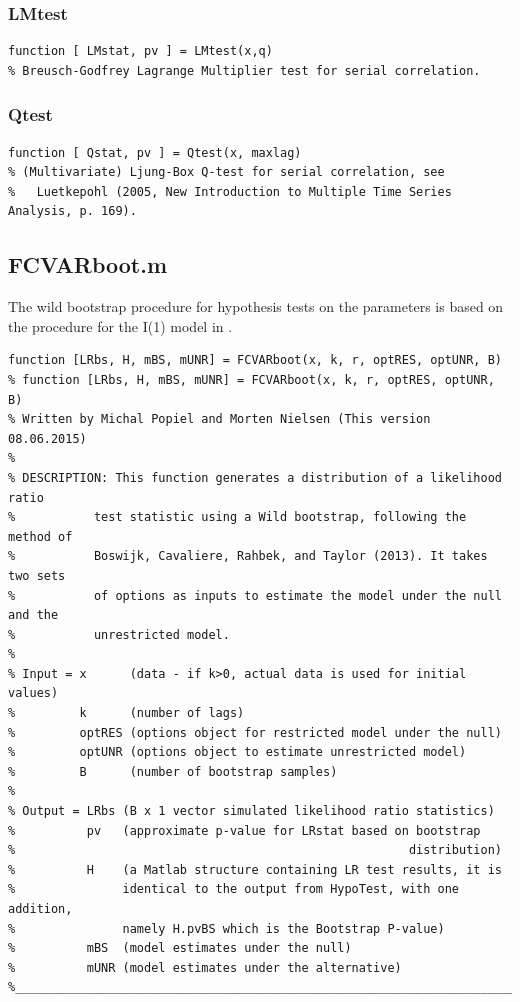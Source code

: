 \documentclass[10pt]{article}
\begin{document}
\subsubsection{LMtest}
\begin{lstlisting}[frame=single,caption={LMtest.m}]
function [ LMstat, pv ] = LMtest(x,q)
% Breusch-Godfrey Lagrange Multiplier test for serial correlation.
\end{lstlisting}

\subsubsection{Qtest}
\begin{lstlisting}[frame=single,caption={Qtest.m}]
function [ Qstat, pv ] = Qtest(x, maxlag)
% (Multivariate) Ljung-Box Q-test for serial correlation, see 
% 	Luetkepohl (2005, New Introduction to Multiple Time Series Analysis, p. 169).
\end{lstlisting}

\subsection{FCVARboot.m}
The wild bootstrap procedure for hypothesis tests on the parameters is based on the procedure for the I(1) model in \cite{Boswijk2013}.
\begin{lstlisting}[frame=single,caption={FCVARboot.m}]
function [LRbs, H, mBS, mUNR] = FCVARboot(x, k, r, optRES, optUNR, B)
% function [LRbs, H, mBS, mUNR] = FCVARboot(x, k, r, optRES, optUNR, B)
% Written by Michal Popiel and Morten Nielsen (This version 08.06.2015)
% 
% DESCRIPTION: This function generates a distribution of a likelihood ratio
%           test statistic using a Wild bootstrap, following the method of
%			Boswijk, Cavaliere, Rahbek, and Taylor (2013). It takes two sets 
%           of options as inputs to estimate the model under the null and the
%           unrestricted model. 
%
% Input = x      (data - if k>0, actual data is used for initial values)
%         k      (number of lags)
%         optRES (options object for restricted model under the null)
%         optUNR (options object to estimate unrestricted model)
%         B      (number of bootstrap samples)
% 
% Output = LRbs (B x 1 vector simulated likelihood ratio statistics)
%          pv   (approximate p-value for LRstat based on bootstrap 
%                                                       distribution)
%          H    (a Matlab structure containing LR test results, it is
%               identical to the output from HypoTest, with one addition,
%               namely H.pvBS which is the Bootstrap P-value)
%          mBS  (model estimates under the null)
%          mUNR (model estimates under the alternative)
%_________________________________________________________________________
\end{lstlisting}
\end{document}
